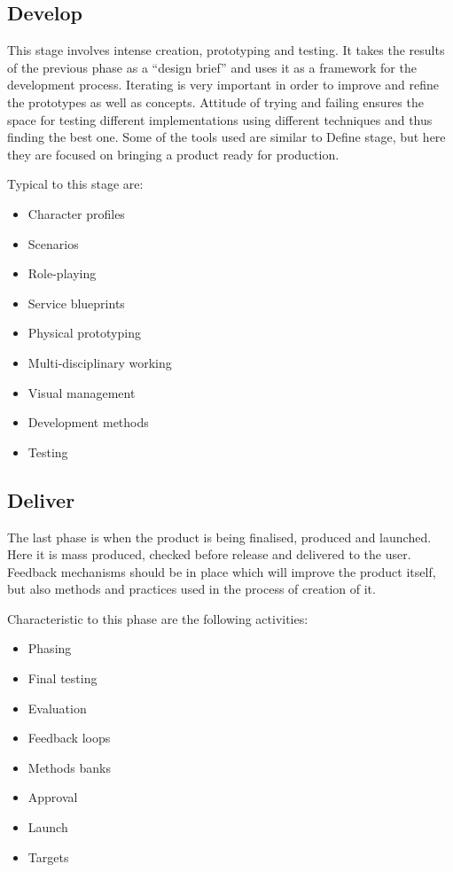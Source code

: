 		
		\subsection{Develop}
		
This stage involves intense creation, prototyping and testing. It takes the results of the previous phase as a “design brief” and uses it as a framework for the development process. Iterating is very important in order to improve and refine the prototypes as well as concepts. Attitude of trying and failing ensures the space for testing different implementations using different techniques and thus finding the best one. Some of the tools used are similar to Define stage, but here they are focused on bringing a product ready for production.

Typical to this stage are:
\begin{itemize}
\item Character profiles
\item Scenarios
\item Role-playing
\item Service blueprints
\item Physical prototyping
\item Multi-disciplinary working
\item Visual management
\item Development methods
\item Testing
\end{itemize}		
		
		\subsection{Deliver}

The last phase is when the product is being finalised, produced and launched. Here it is mass produced, checked before release and delivered to the user. Feedback mechanisms should be in place which will improve the product itself, but also methods and practices used in the process of creation of it.

Characteristic to this phase are the following activities:
\begin{itemize}
\item Phasing
\item Final testing
\item Evaluation
\item Feedback loops
\item Methods banks
\item Approval
\item Launch
\item Targets
\end{itemize}



